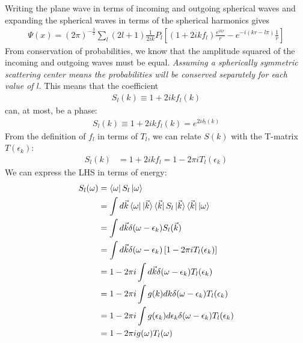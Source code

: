 \documentclass[twoside,11pt]{report}
\numberwithin{equation}{section}
\begin{document}
Writing the plane wave in terms of incoming and outgoing spherical waves and expanding the spherical waves in terms of the spherical harmonics gives
\begin{equation}\begin{aligned}
	\Psi(x) = \left(2\pi\right)^{-\frac{3}{2}}\sum_l (2l+1) \frac{1}{2ik}P_l\left[\left(1 + 2i k f_l \right) \frac{e^{ikr}}{r} - e^{-i\left( kr - l\pi \right) } \frac{1}{r}\right]
\end{aligned}\end{equation}
From conservation of probabilities, we know that the amplitude squared of the incoming and outgoing waves must be equal. \textit{Assuming a spherically symmetric scattering center means the probabilities will be conserved separately for each value of \(l\)}. This means that the coefficient 
\begin{equation}\begin{aligned}
	S_l(k) \equiv 1 + 2i k f_l (k)
\end{aligned}\end{equation}
can, at most, be a phase:
\begin{equation}\begin{aligned}
	S_l (k)\equiv 1 + 2i k f_l (k) = e^{2i\delta_l(k)}
\end{aligned}\end{equation}
From the definition of \(f_l\) in terms of \(T_l\), we can relate \(S(k)\) with the T-matrix \(T(\epsilon_k)\):
\begin{equation}\begin{aligned}
	S_l(k) &= 1 + 2i k f_l = 1 - 2 \pi i T_l(\epsilon_k)
\end{aligned}\end{equation}
We can express the LHS in terms of energy:
\begin{equation}\begin{aligned}
	S_l(\omega) &= \bra{\omega}S_l\ket{\omega} \\
			   &= \int d\vec k \bra{\omega}\ket{\vec k}\bra{\vec k}S_l\ket{\vec k}\bra{\vec k}\ket{\omega}\\
			   &= \int d\vec k \delta(\omega - \epsilon_k)S_l(\vec k)\\
			   &= \int d\vec k \delta(\omega - \epsilon_k)\left[1 - 2 \pi i T_l(\epsilon_k)\right]\\
			   &= 1 - 2 \pi i \int d\vec k \delta(\omega - \epsilon_k)T_l(\epsilon_k)\\
			   &= 1 - 2 \pi i \int g(k) d k \delta(\omega - \epsilon_k)T_l(\epsilon_k)\\
			   &= 1 - 2 \pi i \int g(\epsilon_k) d \epsilon_k \delta(\omega - \epsilon_k)T_l(\epsilon_k)\\
			   &= 1 - 2 \pi i g(\omega) T_l(\omega)
\end{aligned}\end{equation}
\end{document}
